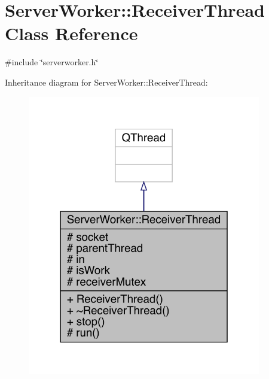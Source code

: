 \hypertarget{a00193}{}\section{Server\+Worker\+:\+:Receiver\+Thread Class Reference}
\label{a00193}


{\ttfamily \#include \char`\"{}serverworker.\+h\char`\"{}}



Inheritance diagram for Server\+Worker\+:\+:Receiver\+Thread\+:
\nopagebreak
\begin{figure}[H]
\begin{center}
\leavevmode
\includegraphics[width=289pt]{dd/da2/a00192}
\end{center}
\end{figure}


